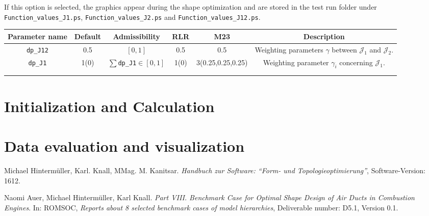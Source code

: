 \documentclass[a4paper,oneside]{book}
\numberwithin{equation}{section}
\begin{document}
If this option is selected, the graphics appear during the shape optimization and are stored in the test run folder under \verb|Function_values_J1.ps|, \verb|Function_values_J2.ps| and \verb|Function_values_J12.ps|.

\begin{table}[htbp]
    \centering
    \begin{tabular}{|c|c|c|c|c|c|}
        \hline
        \cellcolor{light-gray}\textbf{Parameter name} & \cellcolor{light-gray}\textbf{Default} & \cellcolor{light-gray}\textbf{Admissibility} & \cellcolor{light-gray}\textbf{RLR} & \cellcolor{light-gray}\textbf{M23} & \cellcolor{light-gray}\textbf{Description} \\
        \hline
        \verb|dp_J12| & 0.5 & $[0,1]$ & 0.5 & 0.5 & Weighting parameters $\gamma$ between $\mathcal{J}_1$ and $\mathcal{J}_2$. \\
        \hline
        \verb|dp_J1| & 1(0) & $\sum$\verb|dp_J1|$\in[0,1]$ & 1(0) & 3(0.25,0.25,0.25) & Weighting parameter $\gamma_i$ concerning $\mathcal{J}_1$. \\
        \hline
        &  &  &  &  &  \\
        \hline
        &  &  &  &  &  \\
        \hline
    \end{tabular}
\end{table}




\chapter{Initialization and Calculation}


\chapter{Data evaluation and visualization}




\newpage
\begin{thebibliography}{99}
 Michael Hinterm\"uller, Karl. Knall, MMag. M. Kanitsar. \textit{Handbuch zur Software: ``Form- und Topologieoptimierung''}, Software-Version: 1612.

 Naomi Auer, Michael Hinterm\"uller, Karl Knall. \textit{Part VIII. Benchmark Case for Optimal Shape Design of Air Ducts in Combustion Engines}. In: ROMSOC, \textit{Reports about 8 selected benchmark cases of model hierarchies}, Deliverable number: D5.1, Version 0.1.
\end{thebibliography}
\end{document}
